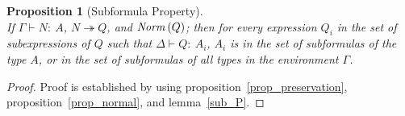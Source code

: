 \documentclass[a4paper]{article}
\makeatletter
\newcommand{\incolor}[1]{#1}    %
\newcommand{\judgecolor}{}
\newcommand{\typecolor}{}
\newcommand{\termcolor}{}
\newcommand{\Typecolor}{}
\newcommand{\Termcolor}{}
\newcommand{\uncolored}{
  \incolor{
    \renewcommand{\judgecolor}{}
    \renewcommand{\typecolor}{}
    \renewcommand{\termcolor}{}
    \renewcommand{\Typecolor}{}
    \renewcommand{\Termcolor}{}
  }
}
\newcommand{\tp}[1]{{\typecolor #1}}
\newcommand{\tm}[1]{{\termcolor #1}}
\newtheorem{proposition}[theorem]{Proposition}
\newtheorem{scheme}[theorem]{Proposition Scheme}
\newcommand{\typarr}[2]{#1\boldsymbol{\rightarrow}#2}
\newcommand{\expabs}[3]{\boldsymbol{\lambda}\,#1\boldsymbol{\colon}#2\boldsymbol{.}\ #3}
\newcommand{\expapp}[2]{#1\ #2}
\newcommand{\env}{\tp{\Gamma}}
\newcommand{\typing}[2]{\tm{#1:\ }\tp{#2}}
\newcommand{\txt}[1]{\text{\textit{#1}}}
\newcommand{\rewrite}[3]{#1 \overset{#2}\mapsto #3}
\newcommand{\reducestar}[3]{#1 \overset{#2}\twoheadrightarrow #3}
\newcommand{\cnd}[1]{\begin{array}[t]{@{}l@{}}\txt{if}\ #1\end{array}}
\newcommand{\norm}[1]{\txt{Norm}\,(#1)}
\makeatother
\begin{document}
\begin{proposition}[Subformula Property]\ \\
\label{prop_subformula}
If $\Gamma \vdash \typing{N}{A}$, $\reducestar{N}{}{Q}$, and $\norm{Q}$;
then for every expression $Q_i$ in the set of subexpressions of $Q$ such
that $\Delta \vdash \typing{Q}{A_i}$, $A_i$ is in the set of subformulas of
the type $A$, or in the set of subformulas of all types in the
environment $\Gamma$.
\end{proposition}
\begin{proof}
Proof is established by using proposition~\ref{prop_preservation},
proposition~\ref{prop_normal}, and lemma~\ref{sub_P}.
\end{proof}




\end{document}
